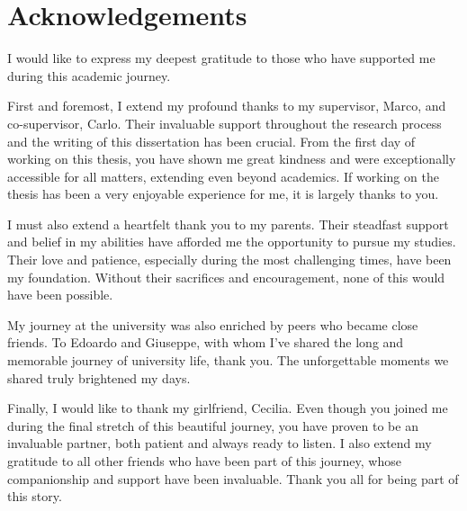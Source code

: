 \chapter*{Acknowledgements}
I would like to express my deepest gratitude to those who have supported me
during this academic journey.

First and foremost, I extend my profound thanks to my supervisor, Marco, and
co-supervisor, Carlo. Their invaluable support throughout the research process
and the writing of this dissertation has been crucial. From the first day of
working on this thesis, you have shown me great kindness and were exceptionally
accessible for all matters, extending even beyond academics. If working on the
thesis has been a very enjoyable experience for me, it is largely thanks to you.

I must also extend a heartfelt thank you to my parents. Their steadfast support
and belief in my abilities have afforded me the opportunity to pursue my
studies. Their love and patience, especially during the most challenging times,
have been my foundation. Without their sacrifices and encouragement, none of
this would have been possible.

My journey at the university was also enriched by peers who became close
friends. To Edoardo and Giuseppe, with whom I've shared the long and memorable
journey of university life, thank you. The unforgettable moments we shared truly
brightened my days.

Finally, I would like to thank my girlfriend, Cecilia. Even though you joined me
during the final stretch of this beautiful journey, you have proven to be an
invaluable partner, both patient and always ready to listen. I also extend my
gratitude to all other friends who have been part of this journey, whose
companionship and support have been invaluable. Thank you all for being part of
this story.
